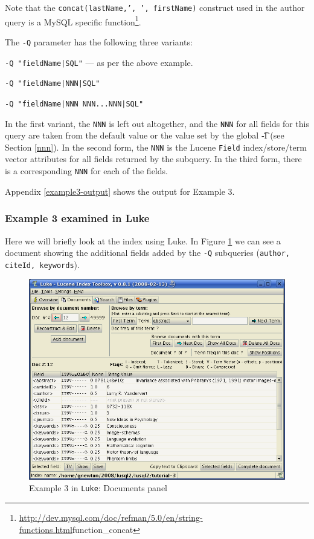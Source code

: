 Note that the {\tt concat(lastName,', ', firstName)} construct used in the
author query is a MySQL specific function\footnote{
\url{http://dev.mysql.com/doc/refman/5.0/en/string-functions.html}{function\_concat}}.

The {\tt -Q} parameter has the following three variants:
\begin{mlist}
\item {\tt -Q "fieldName|SQL"} --- as per the above example.
\item {\tt -Q "fieldName|NNN|SQL"}
\item {\tt -Q "fieldName|NNN NNN...NNN|SQL"}
\end{mlist}

In the first variant, the {\tt NNN} is left out altogether, and the {\tt NNN} for all
fields for this query are taken from the default value or the value set by the
global {\t -I} (see Section \ref{nnn}).
In the second form, the  {\tt NNN} is the Lucene {\tt Field} index/store/term vector
attributes for all fields returned by the subquery.
In the third form, there is a corresponding {\tt NNN} for each of the fields.



Appendix \ref{example3-output} shows the output for Example 3.

\subsubsection{Example 3 examined in Luke}
Here we will briefly look at the index using Luke.
In Figure \ref{luke_3_1} we can see a document showing the additional fields
added by the {\tt -Q} subqueries ({\tt author, citeId, keywords}).
  \begin{figure}
  \begin{center}
 \includegraphics[width=\textwidth]{images/luke_3_1.png}
      \end{center}
  \caption{Example 3 in {\tt Luke}: Documents panel}
\label{luke_3_1}
\end{figure}

